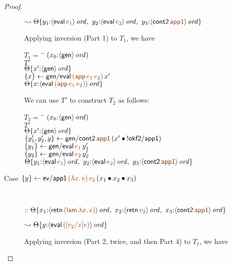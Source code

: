 \begin{proof}
\begin{description}
\qquad\qquad
  $\leadsto
   \tackon{\Theta}
     {y_1{:}\istrue{\susp{{\sf eval}\,\lf{e_1}}}, ~
      y_2{:}\istrue{\susp{{\sf eval}\,\lf{e_2}}}, ~
      y_3{:}\istrue{\susp{{\sf cont2}\,\lf{\sf app1}}}}$
\medskip

Applying inversion (Part 1) to $T_1$, we have 

\begin{tabbing}
$T_1 = ~$ \= \qquad \= $(x_0{:}{\langle {\sf gen} \rangle}\,{{\it ord}})$
\\
\>$T'$
\\
\>\>${\Theta}\{{x'{:}{\langle {\sf gen} \rangle}\,{{\it ord}}}\}$
\\
\>$\trstep{x}{{\sf gen/eval}\,\lf{({\sf app}\,e_1\,e_2)}\,x'}$
\\
\>\>$\tackon{\Theta}{x{:}\istrue{\susp{{\sf eval}\,\lf{({\sf app}\,e_1\,e_2)}}}}$
\end{tabbing}

We can use $T'$ to construct $T_2$ as follows:

\begin{tabbing}
$T_2 = ~$ \= \qquad \= $(x_0{:}{\langle {\sf gen} \rangle}\,{{\it ord}})$
\\
\>$T'$
\\
\>\>${\Theta}\{{x'{:}{\langle {\sf gen} \rangle}\,{{\it ord}}}\}$
\\
\>$\trstep{y_1',y_2',y}{{\sf gen/cont2}\,\lf{{\sf app1}}\,(\tfuser{x'}{\tbangr{{\sf okf2/app1}}})}$
\\
\>$\trstep{y_1}{{\sf gen/eval}\,\lf{e_1}\,y_1'}$
\\
\>$\trstep{y_2}{{\sf gen/eval}\,\lf{e_2}\,y_2'}$
\\
\>\>$\tackon{\Theta}{y_1{:}\istrue{\susp{{\sf eval}\,\lf{e_1}}}, ~
      y_2{:}\istrue{\susp{{\sf eval}\,\lf{e_2}}}, ~
      y_3{:}\istrue{\susp{{\sf cont2}\,\lf{\sf app1}}}}$
\end{tabbing}

\item 
  [Case $\trstep{y}{{\sf ev/app1}\,\lf{(\lambda x.\,e)}\,\lf{v_2}\,(\tfuser{x_1}{\tfuser{x_2}{x_3}})}$]~

\qquad
  $::
   \tackon{\Theta}{x_1{:}\istrue{\susp{{\sf retn}\,\lf{({\sf lam}\,\lambda x.\,e)}}}, ~
                   x_2{:}\istrue{\susp{{\sf retn}\,\lf{v_2}}}, ~
                   x_3{:}\istrue{\susp{{\sf cont2}\,\lf{\sf app1}}}}$

\qquad\qquad
  $\leadsto
   \tackon{\Theta}{y{:}\istrue{\susp{{\sf eval}\,\lf{([v_2/x]e)}}}}$

\medskip
Applying inversion (Part 2, twice, and then Part 4) to $T_1$, we have


\end{description}
\end{proof}
